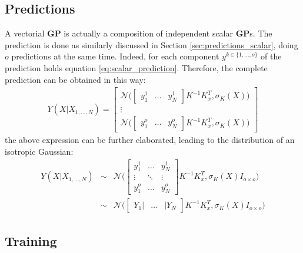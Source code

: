 \documentclass{article}
\begin{document}
\subsection{Predictions}

A vectorial \textbf{GP} is actually a composition of independent scalar \textbf{GP}s.
The prediction is done as similarly discussed in Section \ref{sec:predictions_scalar}, doing $o$ predictions at the same time. Indeed, for each component $y^{k \in \lbrace 1, \hdots ,o\rbrace}$ of the prediction  holds equation \ref{eq:scalar_prediction}. Therefore, the complete prediction can be obtained in this way:
\begin{eqnarray}
Y(X| X_{1,\hdots,N}) = \begin{bmatrix}
\mathcal{N} \bigg (
\begin{bmatrix} y^1_1 & \hdots & y^1_N \end{bmatrix}
K^{-1} K_x^T, 
\sigma_K(X)
\bigg ) \\ 
\vdots \\
\mathcal{N} \bigg (
\begin{bmatrix} y^o_1 & \hdots & y^o_N \end{bmatrix}
K^{-1} K_x^T, 
\sigma_K(X)
\bigg ) 
\end{bmatrix} 
\end{eqnarray}
the above expression can be further elaborated, leading to the distribution of an isotropic Gaussian:
\begin{eqnarray}
Y(X| X_{1,\hdots,N}) 
&\sim &
\mathcal{N} \bigg (
\begin{bmatrix} 
y^1_1 & \hdots & y^1_N \\
\vdots & \ddots & \vdots \\
y^o_1 & \hdots & y^o_N
\end{bmatrix} K^{-1} K_x^T
, \sigma_K(X) I_{o \times o}
\bigg )
\\
&\sim &
\mathcal{N} \bigg (
\begin{bmatrix} Y_1 | & \hdots & | Y_N \end{bmatrix} K^{-1} K_x^T
, \sigma_K(X) I_{o \times o}
\bigg )
\end{eqnarray}

\subsection{Training}
\label{sec:train_vectorial}
\end{document}
